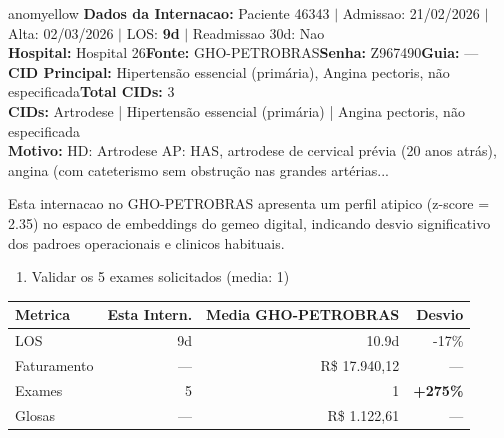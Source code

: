 \documentclass[a4paper,10pt]{article}
\begin{document}
\begin{anomalycard}[Internacao 166154 | GHO-PETROBRAS | MODERADO (z=2.35)]{anomyellow}
\textbf{Dados da Internacao:} Paciente 46343 $\mid$ Admissao: 21/02/2026 $\mid$ Alta: 02/03/2026 $\mid$ LOS: \textbf{9d} $\mid$ Readmissao 30d: Nao\\
\textbf{Hospital:} Hospital 26\quad\textbf{Fonte:} GHO-PETROBRAS\quad\textbf{Senha:} Z967490\quad\textbf{Guia:} ---\\
\textbf{CID Principal:} {\small Hipertensão essencial (primária), Angina pectoris, não especificada}\quad\textbf{Total CIDs:} 3\\

\textbf{CIDs:} {\scriptsize Artrodese | Hipertensão essencial (primária) | Angina pectoris, não especificada}\\

\textbf{Motivo:} {\scriptsize HD: Artrodese  AP: HAS, artrodese de cervical prévia (20 anos atrás), angina (com cateterismo sem obstrução nas grandes artérias...}\\

\vspace{2pt}\begin{tcolorbox}[colback=severityred!20,colframe=anomyellow,title={\textbf{Interpretacao de Negocio}},fonttitle=\bfseries\small,left=4pt,right=4pt,top=3pt,bottom=3pt]
{\small Esta internacao no GHO-PETROBRAS apresenta um perfil atipico (z-score = 2.35) no espaco de embeddings do gemeo digital, indicando desvio significativo dos padroes operacionais e clinicos habituais.}
\end{tcolorbox}
\begin{tcolorbox}[colback=severityyellow!30,colframe=anomorange,title={\textbf{Recomendacoes Especificas}},fonttitle=\bfseries\small,left=4pt,right=4pt,top=3pt,bottom=3pt]
\begin{enumerate}[nosep,leftmargin=16pt]
\item {\small Validar os 5 exames solicitados (media: 1)}
\end{enumerate}
\end{tcolorbox}
\begin{center}\begin{tabular}{l r r r}\toprule\textbf{Metrica} & \textbf{Esta Intern.} & \textbf{Media GHO-PETROBRAS} & \textbf{Desvio} \\\midrule
LOS & 9d & 10.9d & -17\% \\
Faturamento & --- & R\$ 17.940,12 & --- \\
Exames & 5 & 1 & \textcolor{anomred}{\textbf{+275\%}} \\
Glosas & --- & R\$ 1.122,61 & --- \\
\bottomrule\end{tabular}\end{center}


\end{anomalycard}
\end{document}
